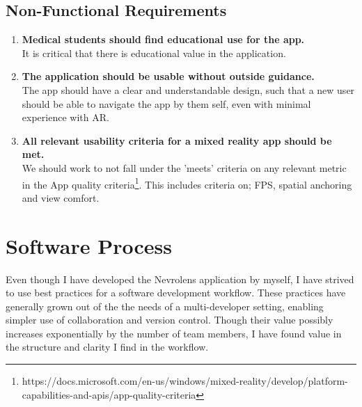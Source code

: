 \subsection*{Non-Functional Requirements}

\begin{enumerate}
    \item {
        \textbf{Medical students should find educational use for the app.}\\
        It is critical that there is educational value in the application. 
    }
    \item {
        \textbf{The application should be usable without outside guidance.}\\
        The app should have a clear and understandable design, such that a new user should be able to navigate the app by them self, even with minimal experience with AR.
    }
    \item {
        \textbf{All relevant usability criteria for a mixed reality app should be met.}\\
We should work to not fall under the 'meets' criteria on any relevant metric in the App quality criteria\footnote{https://docs.microsoft.com/en-us/windows/mixed-reality/develop/platform-capabilities-and-apis/app-quality-criteria}. This includes criteria on; FPS, spatial anchoring and view comfort. 
    }
\end{enumerate}



\section{Software Process}


Even though I have developed the Nevrolens application by myself, I have strived to use best practices for a software development workflow. These practices have generally grown out of the the needs of a multi-developer setting, enabling simpler use of collaboration and version control. Though their value possibly increases exponentially by the number of team members, I have found value in the structure and clarity I find in the workflow. 

